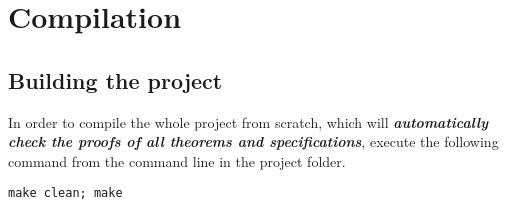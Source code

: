 

\section{Compilation}
\label{sec:compilation}

\subsection{Building the project}
\label{sec:building-project}

In order to compile the whole project from scratch, which will
\emph{\textbf{automatically check the proofs of all theorems and
    specifications}}, execute the following command from the command
line in the project folder.

\begin{lstlisting}
make clean; make
\end{lstlisting}







